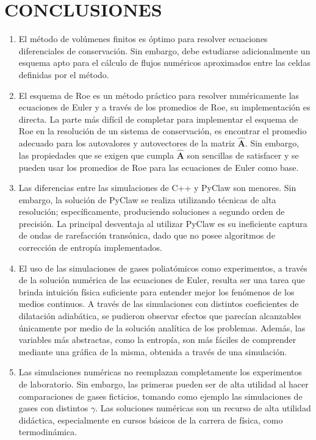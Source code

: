 

\chapter{CONCLUSIONES}
\begin{enumerate}
	\item El método de volúmenes finitos es óptimo para resolver ecuaciones diferenciales de conservación. Sin embargo, debe estudiarse adicionalmente un esquema apto para el cálculo de flujos numéricos aproximados entre las celdas definidas por el método.
	\item El esquema de Roe es un método práctico para resolver numéricamente las ecuaciones de Euler y a través de los promedios de Roe, su implementación es directa. La parte más difícil de completar para implementar el esquema de Roe en la resolución de un sistema de conservación, es encontrar el  promedio adecuado para los autovalores y autovectores de la matriz $\hat{\mathbf{A}}$. Sin embargo, las propiedades que se exigen que cumpla $\hat{\mathbf{A}}$ son sencillas de satisfacer y se pueden usar los promedios de Roe para las ecuaciones de Euler como base.
	\item Las diferencias entre las simulaciones de C++ y PyClaw son menores. Sin embargo, la solución de PyClaw se realiza utilizando técnicas de alta resolución; específicamente, produciendo soluciones a segundo orden de precisión. La principal desventaja al utilizar PyClaw es su ineficiente captura de ondas de rarefacción transónica, dado que no posee algoritmos de corrección de entropía implementados.
	\item El uso de las simulaciones de gases poliatómicos como experimentos, a través de la solución numérica de las ecuaciones de Euler, resulta ser una tarea que brinda intuición física suficiente para entender mejor los fenómenos de los medios continuos. A través de las simulaciones con distintos coeficientes de dilatación adiabática, se pudieron observar efectos que parecían alcanzables únicamente por medio de la solución analítica de los problemas. Además, las variables más abstractas, como la entropía, son más fáciles de comprender mediante una gráfica de la misma, obtenida a través de una simulación.
	\item Las simulaciones numéricas no reemplazan completamente los experimentos de laboratorio. Sin embargo, las primeras pueden ser de alta utilidad al hacer comparaciones de gases ficticios, tomando como ejemplo las simulaciones de gases con distintos $\gamma$. Las soluciones numéricas son un recurso de alta utilidad didáctica, especialmente en cursos básicos de la carrera de física, como termodinámica.
\end{enumerate}

